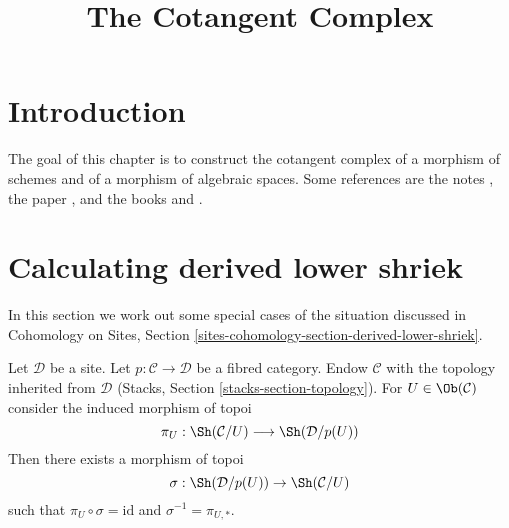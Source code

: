 

%


\title{The Cotangent Complex}


\maketitle

\label{section-phantom}

\tableofcontents

\section{Introduction}
\label{section-introduction}

\noindent
The goal of this chapter is to construct the cotangent complex of a
morphism of schemes and of a morphism of algebraic spaces.
Some references are the notes \cite{quillenhomology}, the paper
\cite{quillencohomology}, and the books
\cite{Andre} and \cite{cotangent}.





\section{Calculating derived lower shriek}
\label{section-calculate}

\noindent
In this section we work out some special cases of the situation
discussed in Cohomology on Sites, Section
\ref{sites-cohomology-section-derived-lower-shriek}.


\begin{lemma}
\label{lemma-situation-when-object}
Let $\mathcal{D}$ be a site. Let $p : \mathcal{C} \to \mathcal{D}$ be a
fibred category. Endow $\mathcal{C}$ with the topology inherited from
$\mathcal{D}$ (Stacks, Section \ref{stacks-section-topology}).
For $U \in \Ob(\mathcal{C})$ consider the induced morphism
of topoi
$$
\pi_U : \Sh(\mathcal{C}/U) \longrightarrow \Sh(\mathcal{D}/p(U))
$$
Then there exists a morphism of topoi
$$
\sigma : \Sh(\mathcal{D}/p(U)) \to \Sh(\mathcal{C}/U)
$$
such that $\pi_U \circ \sigma = \text{id}$ and $\sigma^{-1} = \pi_{U, *}$.
\end{lemma}

